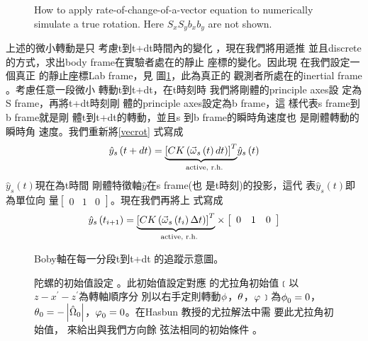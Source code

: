 \documentclass[12pt,twoside]{article}
\begin{document}
\begin{figure}[th]
\caption{How to apply rate-of-change-of-a-vector equation to numerically
simulate a true rotation. Here $S_{x}S_{y}b_{x}b_{y}$ are not shown.}
\label{szsbtdtfig}
\begin{center}
\fbox{}
\end{center}
\end{figure}

上述的微小轉動是只%
考慮t到t+dt時間內的變化%
，現在我們將用遞推%
並且discrete的方式，求出body
frame在實驗者處在的靜止%
座標的變化。因此現%
在我們設定一個真正%
的靜止座標Lab frame\thinspace ，見%
圖\ref{szsbtdtfig}，此為真正的%
觀測者所處在的inertial frame%
。考慮任意一段微小%
轉動t到t+dt，在t時刻時%
我們將剛體的principle axes設%
定為S frame，再將t+dt時刻剛%
體的principle axes設定為b frame，這%
樣代表s frame到b frame就是剛%
體t到t+dt的轉動，並且s%
到b frame的瞬時角速度也%
是剛體轉動的瞬時角%
速度。我們重新將\ref{vecrot}%
式寫成%
\begin{equation}
\hat{y}_{s}\left( t+dt\right) =\underset{\text{active, r.h.}}{\underbrace{%
\left[ CK\left( \vec{\omega}_{s}\left( t\right) dt\right) \right] ^{T}}}\hat{%
y}_{s}\left( t\right)  \label{vecrot05}
\end{equation}%
$\hat{y}_{s}\left( t\right) $現在為t時間%
剛體特徵軸$\hat{y}$在s frame(也%
是t時刻)的投影，這代%
表$\hat{y}_{s}\left( t\right) $即為單位向%
量$\left[ 
\begin{array}{ccc}
0 & 1 & 0%
\end{array}%
\right] $。現在我們再將上%
式寫成%
\begin{equation}
\hat{y}_{s}\left( t_{i+1}\right) =\underset{\text{active, r.h.}}{\underbrace{%
\left[ CK\left( \vec{\omega}_{s}\left( t_{i}\right) \Delta t\right) \right]
^{T}}}\times \left[ 
\begin{array}{ccc}
0 & 1 & 0%
\end{array}%
\right]  \label{vecrot1}
\end{equation}

\begin{figure}[th]
\caption{Boby軸在每一分段t到t+dt%
的追蹤示意圖。}
\begin{center}
\fbox{}
\end{center}
\end{figure}

\begin{figure}[th]
\caption{陀螺的初始值設定%
。此初始值設定對應%
的尤拉角初始值﹝以$%
z-x^{\prime }-z^{\prime }$為轉軸順序分%
別以右手定則轉動$\protect%
\phi $，$\protect\theta $，$\protect\varphi $﹞為$%
\protect\phi _{0}=0$，$\protect\theta _{0}=-\left\vert \hat{\Omega}%
_{0}\right\vert $，$\protect\varphi _{0}=0$。在Hasbun%
教授的尤拉解法中需%
要此尤拉角初始值，%
來給出與我們方向餘%
弦法相同的初始條件%
。}
\begin{center}
\fbox{}
\end{center}
\end{figure}
\end{document}
